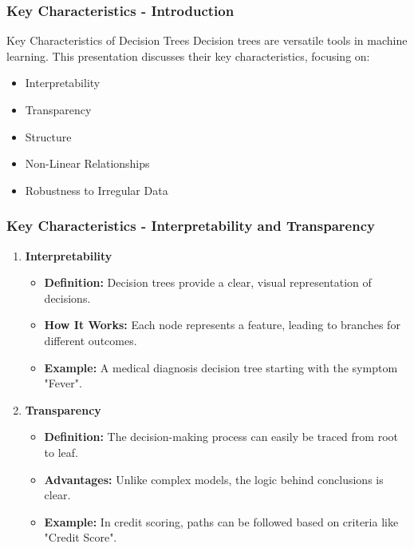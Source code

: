 \documentclass[aspectratio=169]{beamer}
\begin{document}
\begin{frame}[fragile]
    \frametitle{Key Characteristics - Introduction}
    \begin{block}{Key Characteristics of Decision Trees}
        Decision trees are versatile tools in machine learning. This presentation discusses their key characteristics, focusing on:
        \begin{itemize}
            \item Interpretability
            \item Transparency
            \item Structure
            \item Non-Linear Relationships
            \item Robustness to Irregular Data
        \end{itemize}
    \end{block}
\end{frame}

\begin{frame}[fragile]
    \frametitle{Key Characteristics - Interpretability and Transparency}
    \begin{enumerate}
        \item \textbf{Interpretability}
            \begin{itemize}
                \item \textbf{Definition:} Decision trees provide a clear, visual representation of decisions.
                \item \textbf{How It Works:} Each node represents a feature, leading to branches for different outcomes.
                \item \textbf{Example:} A medical diagnosis decision tree starting with the symptom "Fever".
            \end{itemize}

        \item \textbf{Transparency}
            \begin{itemize}
                \item \textbf{Definition:} The decision-making process can easily be traced from root to leaf.
                \item \textbf{Advantages:} Unlike complex models, the logic behind conclusions is clear.
                \item \textbf{Example:} In credit scoring, paths can be followed based on criteria like "Credit Score".
            \end{itemize}
    \end{enumerate}
\end{frame}
\end{document}
